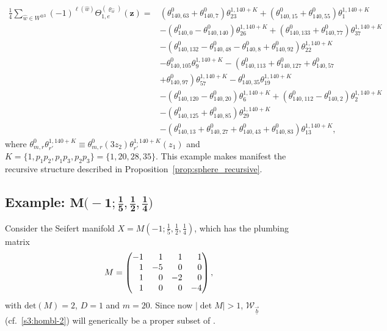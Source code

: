 \documentclass[10pt,a4paper]{amsart}
\theoremstyle{definition}
\numberwithin{equation}{section}
\begin{document}
\begin{align}
\frac{1}{4}\sum_{\hat{w}\in W^{\otimes 3}}(-1)^{\ell(\hat{w})}\Theta^{(\varrho_{\hat{w}})}_{1,e}\left(\mathbf{z}\right)={}&{\left(\theta^{0}_{140,63} + \theta^{0}_{140,7}\right)} \theta^{1,140+K}_{23}
	+ {\left(\theta^{0}_{140,15} + \theta^{0}_{140,55}\right)} \theta^{1,140+K}_{1}\nonumber\\
		 &
	- {\left(\theta^{0}_{140,0} - \theta^{0}_{140,140}\right)} \theta^{1,140+K}_{26}
+ {\left(\theta^{0}_{140,133} + \theta^{0}_{140,77} \right)} \theta^{1,140+K}_{37} \nonumber\\
& 	- \left(\theta^{0}_{140,132} - \theta^{0}_{140,48} - \theta^{0}_{140,8} + \theta^{0}_{140,92} \right) \theta^{1,140+K}_{22}\nonumber\\
&
 - \theta^{0}_{140,105} \theta^{1,140+K}_{9} - \left(\theta^{0}_{140,113} + \theta^{0}_{140,127} + \theta^{0}_{140,57} \right.\nonumber\\
&
+ \left. \theta^{0}_{140,97} \right) \theta^{1,140+K}_{57}- \theta^{0}_{140,35} \theta^{1,140+K}_{19} \nonumber\\
&
- {\left(\theta^{0}_{140,120} - \theta^{0}_{140,20} \right)} \theta^{1,140+K}_{6}+ {\left(\theta^{0}_{140,112} - \theta^{0}_{140,2} \right)} \theta^{1,140+K}_{2} \nonumber\\
&
- {\left(\theta^{0}_{140,125} + \theta^{0}_{140,85} \right)} \theta^{1,140+K}_{29} \nonumber\\
&
- \left(\theta^{0}_{140,13} + \theta^{0}_{140,27} + \theta^{0}_{140,43} + \theta^{0}_{140,83} \right) \theta^{1,140+K}_{13},\label{eq:theta1_example1}
\end{align}
where $\theta^{0}_{m,r} \theta^{1,140+K}_{r'}
\equiv
\theta^{0}_{m,r} (3z_{2} )\theta^{1,140+K}_{r'}(z_{1} )$ and $K=\{ 1,p_{1}p_{2},p_{1}p_{3},p_{2}p_{3} \}=\{ 1,20,28,35 \}$. This example makes manifest the recursive structure described in Proposition~\ref{prop:sphere_recursive}.

\subsection[Example: M(-1;1/5,1/2,1/4)]{Example: $\boldsymbol{M\bigl(-1;\frac{1}{5},\frac{1}{2},\frac{1}{4}\bigr)}$}
Consider the Seifert manifold $X = M\left( -1;\frac{1}{5},\frac{1}{2},\frac{1}{4} \right)$, which has the plumbing matrix
\begin{equation*}
 M=\left(\begin{array}{@{}rrrr@{}}
-1 & 1 & 1 & 1 \\
1 & -5 & 0 & 0 \\
1 & 0 & -2 & 0 \\
1 & 0 & 0 & -4
\end{array}\right),
\end{equation*}
with $\mathrm{det}(M)=2$, $D=1$ and $m=20$. Since now $|\det M|>1$, $\mathcal{W}_{\vec{\underline{b}}}$ (cf.\ \eqref{s3:hombl-2}) will generically be a proper subset of .
\end{document}
